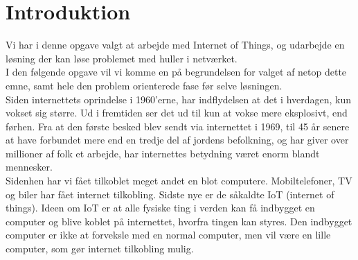 



\chapter{Introduktion}
    Vi har i denne opgave valgt at arbejde med Internet of Things, og udarbejde en løsning der kan løse problemet med huller i netværket.\\
    I den følgende opgave vil vi komme en på begrundelsen for valget af netop dette emne, samt hele den problem orienterede fase før selve løsningen.\\ 
    Siden internettets oprindelse i 1960’erne, har indflydelsen at det i hverdagen, kun vokset sig større. Ud i fremtiden ser det ud til kun at vokse mere eksplosivt, end førhen. Fra at den første besked blev sendt via internettet i 1969, til 45 år senere at have forbundet mere end en tredje del af jordens befolkning, og har giver over millioner af folk et arbejde, har internettes betydning været enorm blandt mennesker.\\
    Sidenhen har vi fået tilkoblet meget andet en blot computere. Mobiltelefoner, TV og biler har fået internet tilkobling. Sidste nye er de såkaldte IoT (internet of things). Ideen om IoT er at alle fysiske ting i verden kan få indbygget en computer og blive koblet på internettet, hvorfra tingen kan styres. Den indbygget computer er ikke at forveksle med en normal computer, men vil være en lille computer, som gør internet tilkobling mulig. 




\newpage